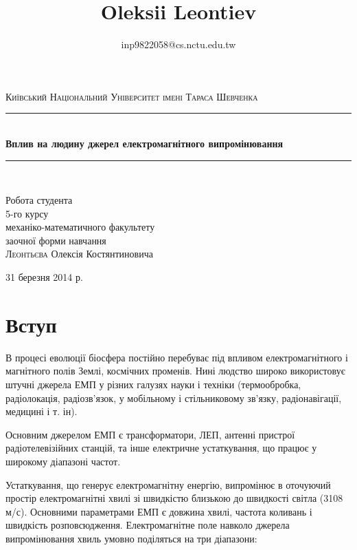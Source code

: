 \documentclass[14pt]{extarticle} %
\title{\bfseries\Huge Oleksii Leontiev}
\author{inp9822058@cs.nctu.edu.tw}
\date{}
\begin{document}
\begin{titlepage}
	\addtolength{\voffset}{-2cm}
	\thispagestyle{fancy}
	\begin{center}
		\newcommand{\HRule}{\rule{\linewidth}{0.5mm}}
		\textsc{\Large Київський Національний Університет імені Тараса
		Шевченка}\\[1.5cm]

		\HRule \\[0.4cm]
		{ \huge \bfseries Вплив на людину джерел електромагнітного
		випромінювання}\\[0.4cm]

		\HRule \\[1.5cm]

			\begin{flushright} \large
				Робота студента\\
				5-го курсу\\
				механіко-математичного факультету\\
				заочної форми навчання\\
				\textsc{Леонтьєва} Олексія Костянтиновича
			\end{flushright}

		\vfill

		{\large 31 березня 2014 р.}
	\end{center}
\end{titlepage}
\section{Вступ}
В процесі еволюції біосфера постійно перебуває під впливом електромагнітного і
магнітного полів Землі, космічних променів. Нині людство широко використовує
штучні джерела ЕМП у різних галузях науки і техніки (термообробка,
радіолокація, радіозв’язок, у мобільному і стільниковому зв’язку,
радіонавігації, медицині і т. ін).

Основним джерелом ЕМП є трансформатори, ЛЕП, антенні пристрої радіотелевізійних
станцій, та інше електричне устаткування, що працює у широкому діапазоні
частот.

Устаткування, що генерує електромагнітну енергію, випромінює в оточуючий
простір електромагнітні хвилі зі швидкістю близькою до швидкості світла (3108
м/с). Основними параметрами ЕМП є довжина хвилі, частота коливань і швидкість
розповсюдження.
Електромагнітне поле навколо джерела випромінювання хвиль умовно поділяться на
три діапазони:
\end{document}
